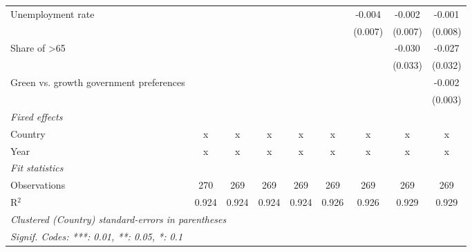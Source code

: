 \begin{table}[htbp]
\begin{tabular}{lcccccccc}
      Unemployment rate                                        &         &         &         &         &         & -0.004  & -0.002  & -0.001\\   
                                                               &         &         &         &         &         & (0.007) & (0.007) & (0.008)\\   
      Share of >65                                             &         &         &         &         &         &         & -0.030  & -0.027\\   
                                                               &         &         &         &         &         &         & (0.033) & (0.032)\\   
      Green vs. growth government preferences                  &         &         &         &         &         &         &         & -0.002\\   
                                                               &         &         &         &         &         &         &         & (0.003)\\   
      \emph{Fixed effects}\\
      Country                                                  & x       & x       & x       & x       & x       & x       & x       & x\\  
      Year                                                     & x       & x       & x       & x       & x       & x       & x       & x\\  
      \midrule \emph{Fit statistics}\\
      Observations                                             & 270     & 269     & 269     & 269     & 269     & 269     & 269     & 269\\  
      R$^2$                                                    & 0.924   & 0.924   & 0.924   & 0.924   & 0.926   & 0.926   & 0.929   & 0.929\\  
      \midrule
      \multicolumn{9}{l}{\emph{Clustered (Country) standard-errors in parentheses}}\\
      \multicolumn{9}{l}{\emph{Signif. Codes: ***: 0.01, **: 0.05, *: 0.1}}\\
   \end{tabular}
\end{table}



